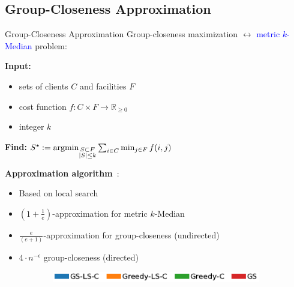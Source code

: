 \documentclass[10pt,titlepage,english,presentation]{beamer}
\newcommand{\emphcolor}{blue}
\renewcommand{\emph}[1]{\textcolor{\emphcolor}{#1}}
\begin{document}
\subsection{Group-Closeness Approximation}

\begin{frame}[t]{Group-Closeness Approximation}
\footnotesize
Group-closeness maximization $\longleftrightarrow$ \emph{metric $k$-Median} problem:\medskip

\begin{minipage}[t]{.45\textwidth}
\textbf{Input:}
\begin{itemize}
    \scriptsize
    \item sets of clients $C$ and facilities $F$
    \item cost function $f: C\times F \to \mathbb{R}_{\ge 0}$
    \item integer $k$
\end{itemize}\smallskip

\scriptsize
\textbf{Find:} $S^\star := \operatorname*{argmin}_{\substack{S\subset F\\|S| \le k}}\sum_{i\in C}\min_{j\in F}f(i,j)$
\end{minipage}\hfill
\begin{minipage}[t]{.55\textwidth}
    \textbf{Approximation algorithm}~\parencite{DBLP:journals/siamcomp/AryaGKMMP04}:
\begin{itemize}
\scriptsize
\item Based on local search
\item $(1 + \frac{1}{e})$-approximation for metric $k$-Median~\parencite{DBLP:journals/tmc/DAngeloDNP16}
\item[\emph{\faHandORight}] $\frac{e}{(e + 1)}$-approximation for group-closeness (undirected)
\item[\emph{\faHandORight}] $4\cdot n^{-\epsilon}$ group-closeness
(directed)~\parencite{DBLP:conf/alenex/AngrimanBDGGM21}
\end{itemize}
\end{minipage}\bigskip

\begin{minipage}[t]{.55\textwidth}
\begin{figure}
\begin{subfigure}[t]{\textwidth}
\centering
\includegraphics[width=.7\textwidth]{../sources/plots/gh-gc-apx/legend-quality-closeness.pdf}
\end{subfigure}\smallskip


\end{figure}
\end{minipage}
\end{frame}
\end{document}
